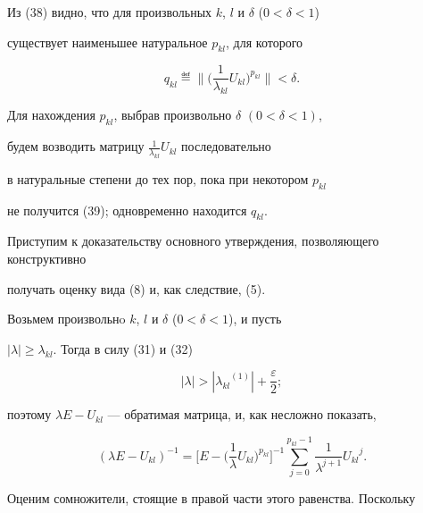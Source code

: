 \begin{note}


Из (38) видно, что для произвольных $k$, $l$ и $\delta$ ($0<\delta<1$)


существует наименьшее натуральное $p_{kl}$, для которого


\begin{equation}


q_{kl}\eqdef \bigg\|\bigg(\frac{1}


{\lambda_{kl}}U_{kl}\bigg)^{p_{kl}}\bigg\|< \delta.


\end{equation}


Для нахождения $p_{kl}$, выбрав произвольно $\delta$ $(0<\delta<1)$,


будем возводить матрицу ${\frac{1}{\lambda_{kl}}U_{kl}}$ последовательно


в натуральные степени до тех пор, пока при некотором $p_{kl}$


не получится (39); одновременно находится $q_{kl}$.


\end{note}





Приступим к доказательству основного утверждения, позволяющего конструктивно


получать оценку вида (8) и, как следствие, (5).





Возьмем произвольнo $k$, $l$ и $\delta$ ($0<\delta<1$), и пусть


$|\lambda|\ge\lambda_{kl}$. Тогда в силу (31) и (32)


$$


|\lambda|>|{\lambda_{kl}}^{(1)}|+\frac{{\varepsilon}}{2};


$$


поэтому $\lambda E-U_{kl}$ --- обратимая матрица, и, как несложно показать,


\begin{equation}


(\lambda E-U_{kl})^{-1}=\bigg[E-\bigg(


\frac{1}{\lambda}U_{kl}\bigg)^{p_{kl}}\bigg]^{-1}


\sum_{j=0}^{p_{kl}-1}\frac{1}{\lambda^{j+1}}{U_{kl}}^j.


\end{equation}


Оценим сомножители, стоящие в правой части этого равенства. Поскольку


